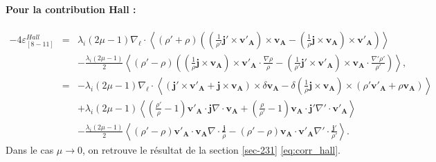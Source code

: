 \paragraph{Pour la contribution \acs{Hall} :}
\begin{eqnarray}
  \label{eq:turb_bin_TEMH} - 4  \varepsilon^{Hall}_{[8-11]} \nonumber
    &=&\lambda_i\left(2\mu-1 \right)\nabla_{\boldsymbol{\ell}} \cdot \left< \left(\rho' + \rho\right) \left( \left(\frac{1}{\rho'}\boldsymbol{j'} \times \boldsymbol{v'_A}\right)\times \boldsymbol{v_A}  -  \left(\frac{1}{\rho}\boldsymbol{j} \times \boldsymbol{v_A}\right)\times \boldsymbol{v'_A}\right)\right>  \nonumber\\ 
  &&- \frac{\lambda_i\left(2\mu-1 \right)}{2} \left<\left(\rho' - \rho\right) \left(\left(\frac{1}{\rho}\boldsymbol{j} \times \boldsymbol{v_A}\right)\times \boldsymbol{v'_A} \cdot \frac{\nabla  \rho }{\rho}-\left(\frac{1}{\rho'}\boldsymbol{j'} \times \boldsymbol{v'_A}\right)\times \boldsymbol{v_A}\cdot \frac{\nabla'  \rho' }{\rho'}\right)\right>, \nonumber\\
  &=&- \lambda_i\left(2\mu-1 \right)\nabla_{\boldsymbol{\ell}} \cdot \left< \left(\boldsymbol{j'} \times \boldsymbol{v'_A} + \boldsymbol{j} \times \boldsymbol{v_A}\right)\times \delta \boldsymbol{v_A}  - \delta \left(\frac{1}{\rho}\boldsymbol{j} \times \boldsymbol{v_A}\right)\times \left( \rho'\boldsymbol{v'_A} +  \rho\boldsymbol{v_A}\right) \right>  \nonumber\\ 
   &&+ \lambda_i\left(2\mu-1 \right) \left<\left(\frac{\rho'}{\rho} - 1\right) \boldsymbol{v'_A} \cdot \boldsymbol{j} \nabla\cdot \boldsymbol{v_A} +\left(\frac{\rho}{\rho'}-1\right) \boldsymbol{v_A} \cdot  \boldsymbol{j'}\nabla'\cdot  \boldsymbol{v'_A} \right> \nonumber\\
  &&- \frac{\lambda_i\left(2\mu-1 \right)}{2} \left<   \left(\rho' - \rho\right) \boldsymbol{v'_A}\cdot \boldsymbol{v_A}  \nabla  \cdot\frac{\boldsymbol{j}}{\rho} - \left(\rho' - \rho\right)\boldsymbol{v_A} \cdot \boldsymbol{v'_A}\nabla'  
  \cdot \frac{ \boldsymbol{j'} }{\rho'}\right>. 
\end{eqnarray}
Dans le cas $\mu \rightarrow 0$, on retrouve le résultat de la section \ref{sec-231} \eqref{eq:corr_hall}. 
